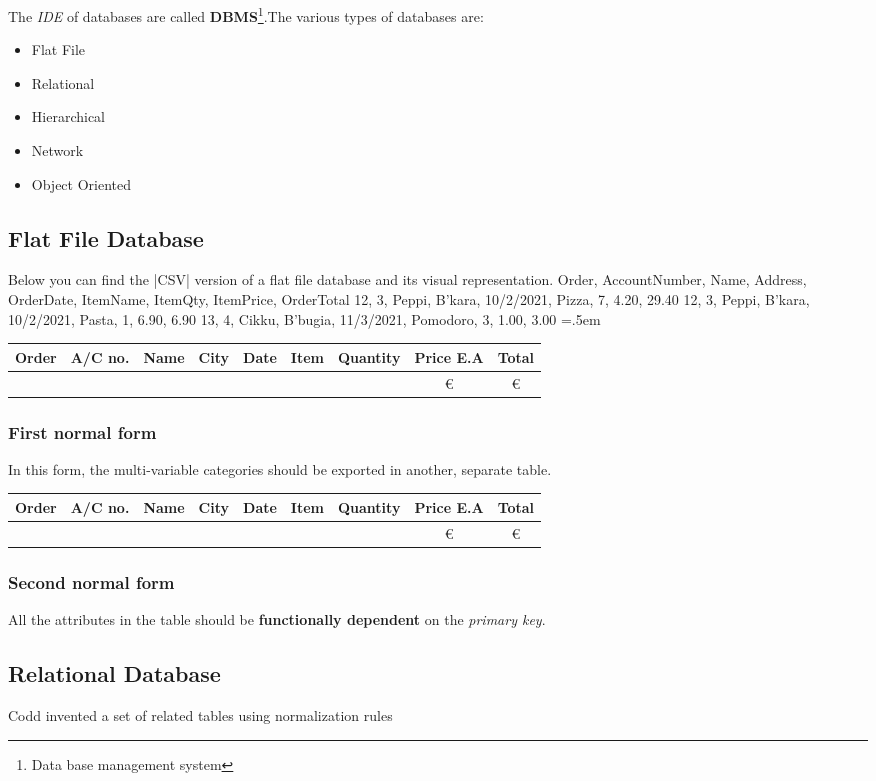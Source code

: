 \documentclass{article}
\newenvironment{lcverbatim}
{\SaveVerbatim{cverb}}
{\endSaveVerbatim
	\flushleft\fboxrule=0pt\fboxsep=.5em
	\colorbox{cverbbg}{%
		\makebox[\dimexpr\linewidth-2\fboxsep][l]{\BUseVerbatim{cverb}}%
	}
	\endflushleft
}
\begin{document}
		The \textit{IDE} of databases are called \textbf{DBMS}\footnote{Data base management system}.The various types of databases are: 
		\begin{itemize}
			\item{Flat File}
			\item{Relational}
			\item{Hierarchical}
			\item{Network}
			\item{Object Oriented}
		\end{itemize}
	\subsection{Flat File Database}
	Below you can find the \cverb|CSV| version of a flat file database and its visual representation.
\begin{lcverbatim}
Order, AccountNumber, Name, Address, OrderDate, ItemName, ItemQty, ItemPrice, OrderTotal
12, 3, Peppi, B'kara, 10/2/2021, Pizza, 7, 4.20, 29.40
12, 3, Peppi, B'kara, 10/2/2021, Pasta, 1, 6.90, 6.90 
13, 4, Cikku, B'bugia, 11/3/2021, Pomodoro, 3, 1.00, 3.00
\end{lcverbatim}
\begin{center}
		\begin{tabular}{|c|c|c|c|c|c|c|c|c|}%
		\hline
		\bfseries Order & \bfseries A/C no. & \bfseries Name &\bfseries City &\bfseries Date & \bfseries Item &\bfseries Quantity &\bfseries Price E.A &\bfseries Total 
		\csvreader[head to column names]{flat_file.csv}{}%
		{\\\hline\Order & \AccountNumber &  \Name & \Address & \OrderDate & \ItemName & \ItemQty & \euro\ItemPrice & \euro\OrderTotal}
		\\\hline
	\end{tabular}
\end{center}
\subsubsection{First normal form}
In this form, the multi-variable categories should be exported in another, separate table.
\begin{multicols}{2}
\begin{center}
	\begin{tabular}{|c|c|c|c|c|c|c|c|c|}%
		\hline
		\bfseries Order & \bfseries A/C no. & \bfseries Name &\bfseries City &\bfseries Date & \bfseries Item &\bfseries Quantity &\bfseries Price E.A &\bfseries Total 
		\csvreader[head to column names]{flat_file.csv}{}%
		{\\\hline\Order & \AccountNumber &  \Name & \Address & \OrderDate & \ItemName & \ItemQty & \euro\ItemPrice & \euro\OrderTotal}
		\\\hline
	\end{tabular}
\end{center}
\end{multicols}
\subsubsection{Second normal form}
All the attributes in the table should be \textbf{functionally dependent} on the \emph{primary key}.

	
	\subsection{Relational Database}
		Codd invented a set of related tables using normalization rules
\end{document}

